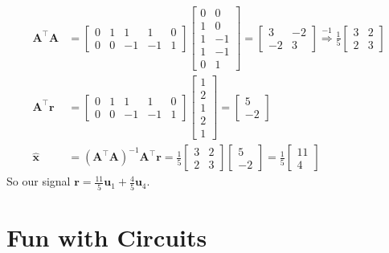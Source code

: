 \documentclass[]{article}
\newcommand{\unit}[1]{\bm{\hat{#1}}}
\newcommand{\tpose}[1]{#1^{\! \top} \!}
\begin{document}
\begin{align}
	\tpose{\bm{A}} \bm{A} &=
	\begin{bmatrix}
	0 & 1 & 1 & 1 & 0 \\
	0 & 0 & -1 & -1 & 1
	\end{bmatrix}
	\begin{bmatrix}
	0 & 0 \\
	1 & 0 \\
	1 & -1 \\
	1 & -1 \\
	0 & 1
	\end{bmatrix} =
	\begin{bmatrix}
	3 & -2 \\
	-2 & 3
	\end{bmatrix}
	\overset{-1}{\Rightarrow}
	\frac{1}{5}\begin{bmatrix}
	3 & 2 \\
	2 & 3
	\end{bmatrix} \\
	\tpose{\bm{A}} \bm{r} &= 
	\begin{bmatrix}
	0 & 1 & 1 & 1 & 0 \\
	0 & 0 & -1 & -1 & 1
	\end{bmatrix}
	\begin{bmatrix}
	1 \\
	2 \\
	1 \\
	2 \\
	1
	\end{bmatrix}
	=
	\begin{bmatrix}
	5 \\
	-2
	\end{bmatrix} \\
	\unit{x} &= (\tpose{\bm{A}} \bm{A})^{-1} \tpose{\bm{A}} \bm{r} =
	\frac{1}{5}\begin{bmatrix}
	3 & 2 \\
	2 & 3
	\end{bmatrix}
	\begin{bmatrix}
	5 \\
	-2
	\end{bmatrix}
	=
	\frac{1}{5}\begin{bmatrix}
	11 \\
	4
	\end{bmatrix}
\end{align}
So our signal \(\bm{r} = \frac{11}{5}\bm{u}_1 + \frac{4}{5}\bm{u}_4\).

\section{Fun with Circuits}
\end{document}
